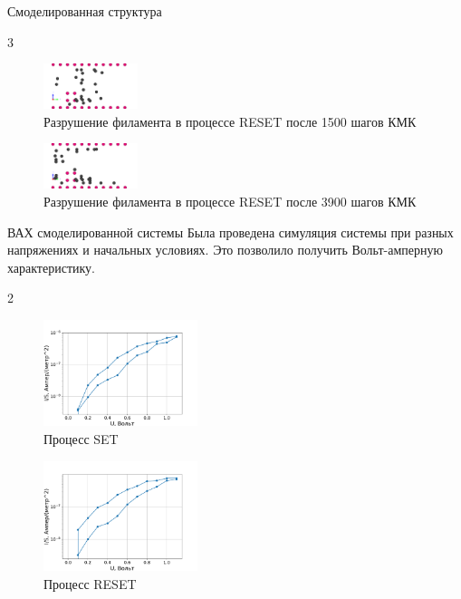 \documentclass{beamer}%
\begin{document}
\begin{frame}{Смоделированная структура}{}
\begin {multicols} {3}
\begin{figure}
    \centering
    \includegraphics[height=50px]{img/150.pdf}
    \caption{Разрушение филамента в процессе RESET после 1500 шагов КМК
    }
\end{figure}

\begin{figure}
    \centering
    \includegraphics[height=50px]{img/390.pdf}
    \caption{Разрушение филамента в процессе RESET после 3900 шагов КМК
    }
\end{figure}
\end{multicols}
\end{frame}

\begin{frame}{ВАХ смоделированной системы}
    Была проведена симуляция системы при разных напряжениях и начальных условиях.
    Это позволило получить Вольт-амперную характеристику.
    \begin {multicols}{2}
        \begin{figure}
            \centering
            \includegraphics[width=170px]{img/SET.pdf}
            \caption {Процесс SET}
        \end{figure}
        \columnbreak
        \begin{figure}
            \centering
            \includegraphics[width=170px]{img/RESET.pdf}
            \caption {Процесс RESET}
        \end{figure}   
    \end{multicols}

\end{frame}
\end{document}
